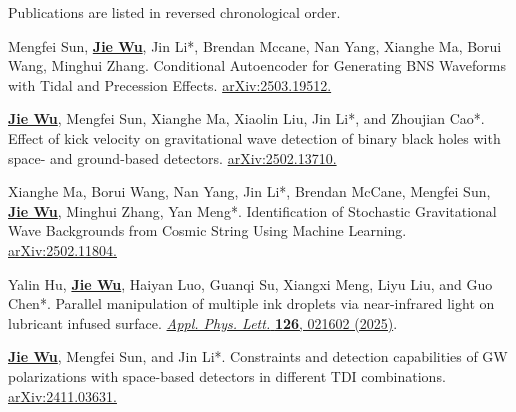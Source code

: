 


\begin{cvparagraph}
    Publications are listed in reversed chronological order.
\end{cvparagraph}

\begin{cvpublications}
\begin{pubitems} 
\item {Mengfei Sun, \textbf{\underline{Jie Wu}}, Jin Li*, Brendan Mccane, Nan Yang, Xianghe Ma, Borui Wang, Minghui Zhang. Conditional Autoencoder for Generating BNS Waveforms with Tidal and Precession Effects. \href{https://arxiv.org/abs/2503.19512}{arXiv:2503.19512.}}

\item {\textbf{\underline{Jie Wu}}, Mengfei Sun, Xianghe Ma, Xiaolin Liu, Jin Li*, and Zhoujian Cao*. Effect of kick velocity on gravitational wave detection of binary black holes with space- and ground-based detectors. \href{https://arxiv.org/abs/2502.13710}{arXiv:2502.13710.}}

\item {Xianghe Ma, Borui Wang, Nan Yang, Jin Li*, Brendan McCane, Mengfei Sun, \textbf{\underline{Jie Wu}}, Minghui Zhang, Yan Meng*. Identification of Stochastic Gravitational Wave Backgrounds from Cosmic String Using Machine Learning. \href{https://arxiv.org/abs/2502.11804}{arXiv:2502.11804.}}

\item {Yalin Hu, \textbf{\underline{Jie Wu}}, Haiyan Luo, Guanqi Su, Xiangxi Meng, Liyu Liu, and Guo Chen*. Parallel manipulation of multiple ink droplets via near-infrared light on lubricant infused surface. \href{https://pubs.aip.org/aip/apl/article/126/2/021602/3330590}{\textit{Appl. Phys. Lett.} \textbf{126}, 021602 (2025)}.}

\item {\textbf{\underline{Jie Wu}}, Mengfei Sun, and Jin Li*. Constraints and detection capabilities of GW polarizations with space-based detectors in different TDI combinations. \href{https://arxiv.org/abs/2411.03631}{arXiv:2411.03631.}}


\end{pubitems}
\end{cvpublications}
